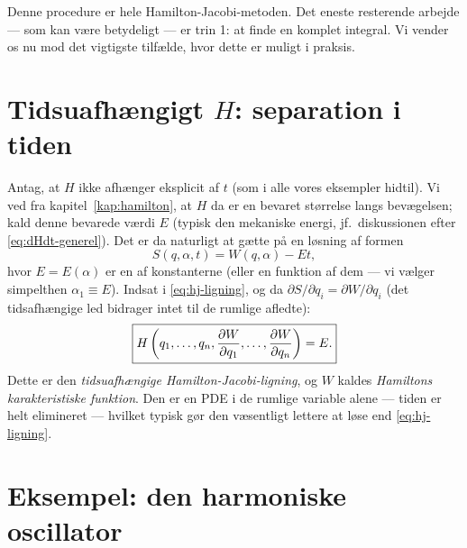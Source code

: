 Denne procedure er hele Hamilton-Jacobi-metoden. Det eneste
resterende arbejde — som kan være betydeligt — er trin 1: at finde en
komplet integral. Vi vender os nu mod det vigtigste tilfælde, hvor
dette er muligt i praksis.

\section{Tidsuafhængigt $H$: separation i tiden}
\label{sec:separation}

Antag, at $H$ ikke afhænger eksplicit af $t$ (som i alle vores
eksempler hidtil). Vi ved fra kapitel~\ref{kap:hamilton}, at $H$ da er
en bevaret størrelse langs bevægelsen; kald denne bevarede værdi $E$
(typisk den mekaniske energi, jf.\ diskussionen efter
\eqref{eq:dHdt-generel}). Det er da naturligt at gætte på en løsning
af formen
\begin{equation}
  S(q,\alpha,t) = W(q,\alpha) - Et,
  \label{eq:S-separation-tid}
\end{equation}
hvor $E=E(\alpha)$ er en af konstanterne (eller en funktion af dem —
vi vælger simpelthen $\alpha_1\equiv E$). Indsat i
\eqref{eq:hj-ligning}, og da $\partial S/\partial q_i=\partial W/\partial q_i$
(det tidsafhængige led bidrager intet til de rumlige afledte):
\begin{equation}
  \boxed{H\left(q_1,\dots,q_n,\pdv{W}{q_1},\dots,\pdv{W}{q_n}\right) = E.}
  \label{eq:hj-tidsuafhaengig}
\end{equation}
Dette er den \emph{tidsuafhængige Hamilton-Jacobi-ligning}, og $W$
kaldes \emph{Hamiltons karakteristiske funktion}. Den er en PDE i de
rumlige variable alene — tiden er helt elimineret — hvilket typisk gør
den væsentligt lettere at løse end \eqref{eq:hj-ligning}.

\section{Eksempel: den harmoniske oscillator}

